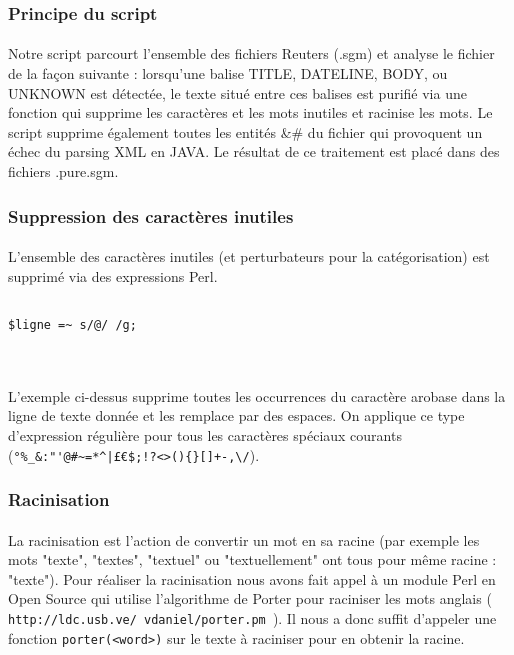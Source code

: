 \subsubsection{Principe du script}
\paragraph{}
Notre script parcourt l'ensemble des fichiers Reuters (.sgm) et analyse le fichier de la façon suivante : lorsqu'une balise TITLE, DATELINE, BODY, ou UNKNOWN est détectée, le texte situé entre ces balises est purifié via une fonction qui supprime les caractères et les mots inutiles et racinise les mots. Le script supprime également toutes les entités \&\# du fichier qui provoquent un échec du parsing XML en JAVA. Le résultat de ce traitement est placé dans des fichiers .pure.sgm.

\subsubsection{Suppression des caractères inutiles}
\paragraph{}
L'ensemble des caractères inutiles (et perturbateurs pour la catégorisation) est supprimé via des expressions Perl.
~~\\
\begin{verbatim}

$ligne =~ s/@/ /g;
\end{verbatim}
~~\\
\paragraph{}
L'exemple ci-dessus supprime toutes les occurrences du caractère arobase dans la ligne de texte donnée et les remplace par des espaces. On applique ce type d'expression régulière pour tous les caractères spéciaux courants\\(\verb.°%_&:"'@#~=*^|£€$;!?<>(){}[]+-,\/.).

\subsubsection{Racinisation}
\paragraph{}
La racinisation est l'action de convertir un mot en sa racine (par exemple les mots "texte", "textes", "textuel" ou "textuellement" ont tous pour même racine : "texte"). Pour réaliser la racinisation nous avons fait appel à un module Perl en Open Source qui utilise l'algorithme de Porter pour raciniser les mots anglais (\texttt{ http://ldc.usb.ve/~vdaniel/porter.pm }). Il nous a donc suffit d'appeler une fonction \texttt{porter(<word>)} sur le texte à raciniser pour en obtenir la racine.

